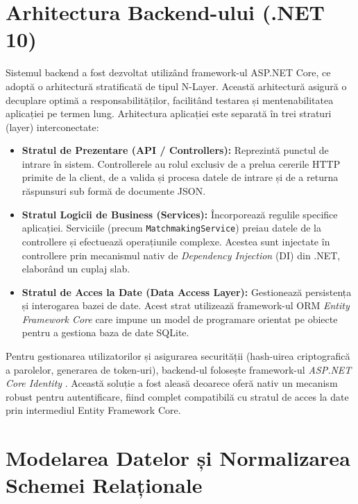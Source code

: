 \section{Arhitectura Backend-ului (.NET 10)}
\label{sec:arhitectura_backend}

Sistemul backend a fost dezvoltat utilizând framework-ul ASP.NET Core, ce adoptă o  arhitectură stratificată de tipul N-Layer. Această arhitectură asigură o decuplare optimă a responsabilităților, facilitând testarea și mentenabilitatea aplicației pe termen lung. Arhitectura aplicației este separată în trei straturi (layer) interconectate:

\begin{itemize}
    \item \textbf{Stratul de Prezentare (API / Controllers):} Reprezintă punctul de intrare în sistem. Controllerele au rolul exclusiv de a prelua cererile HTTP primite de la client, de a valida și procesa datele de intrare și de a returna răspunsuri sub formă de documente JSON.
    \item \textbf{Stratul Logicii de Business (Services):} Încorporează regulile specifice aplicației. Serviciile (precum \texttt{MatchmakingService}) preiau datele de la controllere și efectuează operațiunile complexe. Acestea sunt injectate în controllere prin mecanismul nativ de \textit{Dependency Injection} (DI) \cite{aspnet_docs} din .NET, elaborând un cuplaj slab.
    \item \textbf{Stratul de Acces la Date (Data Access Layer):} Gestionează persistența și interogarea bazei de date. Acest strat utilizează framework-ul ORM \textit{Entity Framework Core} \cite{ef_core_action} care impune un model de programare orientat pe obiecte pentru a gestiona baza de date SQLite.
\end{itemize}

Pentru gestionarea utilizatorilor și asigurarea securității (hash-uirea criptografică a parolelor, generarea de token-uri), backend-ul folosește framework-ul \textit{ASP.NET Core Identity} \cite{aspnet_identity_docs}. Această soluție a fost aleasă deoarece oferă nativ un mecanism robust pentru autentificare, fiind complet compatibilă cu stratul de acces la date prin intermediul Entity Framework Core.


\section{Modelarea Datelor și Normalizarea Schemei Relaționale}
\label{sec:database}

